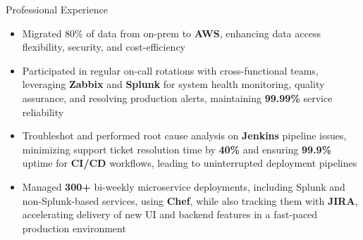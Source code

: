 \documentclass{resume}
\begin{document}
\begin{experienceSection}{Professional Experience}
    \experienceItem[
        company={Cerner Healthcare (Oracle Health)},
        location={Bangalore, India},
        position={System Engineer - 1},
        duration={May 2021 - Jul 2023}
    ]
    \begin{itemize}
        \itemsep -6pt {}
        \item Migrated 80\% of data from on-prem to \textbf{AWS}, enhancing data access flexibility, security, and cost-efficiency
        \item Participated in regular on-call rotations with cross-functional teams, leveraging \textbf{Zabbix} and \textbf{Splunk} for system health monitoring, quality assurance, and resolving production alerts, maintaining \textbf{99.99\%} service reliability
        \item Troubleshot and performed root cause analysis on \textbf{Jenkins} pipeline issues, minimizing support ticket resolution time by \textbf{40\%} and ensuring \textbf{99.9\%} uptime for \textbf{CI/CD} workflows, leading to uninterrupted deployment pipelines
        \item Managed \textbf{300+} bi-weekly microservice deployments, including Splunk and non-Splunk-based services, using \textbf{Chef}, while also tracking them with \textbf{JIRA}, accelerating delivery of new UI and backend features in a fast-paced production environment
    \end{itemize}

\end{experienceSection}
\end{document}
